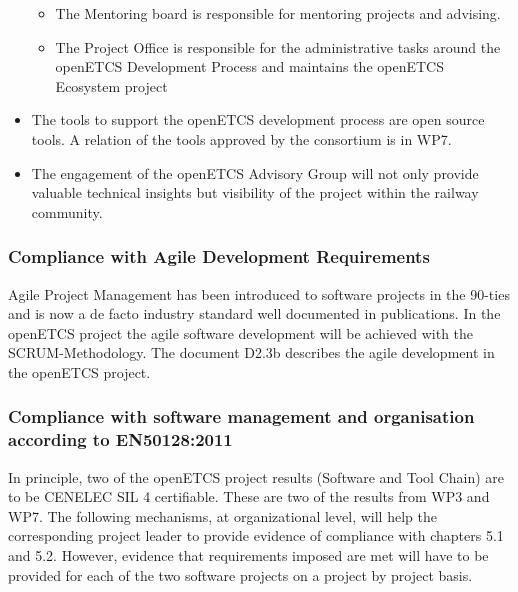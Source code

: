 \documentclass{template/openetcs_article}
\begin{document}
\begin{itemize}
\begin{itemize}
\item The Mentoring board is responsible for mentoring projects and advising.
\item The Project Office is responsible for the administrative tasks around the openETCS Development Process and maintains the openETCS Ecosystem project
\end{itemize}
\item The tools to support the openETCS development process are open source tools. A relation of the tools approved by the consortium is in WP7.
\item The engagement of the openETCS Advisory Group will not only provide valuable technical insights but visibility of the project within the railway community.
\end{itemize}

\subsubsection{Compliance with Agile Development Requirements}
Agile Project Management has been introduced to software projects in the 90-ties and is now a de facto industry standard well documented in publications. In the openETCS project the agile software development will be achieved with the SCRUM-Methodology. The document D2.3b \cite{AgileDev} describes the agile development in the openETCS project.



\subsubsection{Compliance with software management and organisation according to EN50128:2011}
In principle, two of the openETCS project results (Software and Tool Chain) are to be CENELEC \gls{SIL} 4 certifiable. These are two of the results from WP3 and WP7. The following mechanisms, at organizational level, will help the corresponding project leader to provide evidence of compliance with chapters 5.1 and 5.2. However, evidence that requirements imposed are met will have to be provided for each of the two software projects on a project by project basis. 
\end{document}
